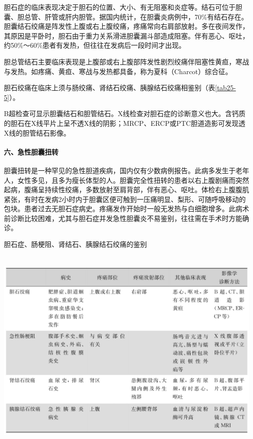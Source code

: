 胆石症的临床表现决定于胆石的位置、大小、有无阻塞和炎症等。结石可位于胆囊、胆总管、肝管或肝内胆管。据国内统计，在胆囊炎病例中，70\%有结石存在。胆囊结石绞痛是阵发性上腹或右上腹绞痛，疼痛常向右肩部放射。多在夜间发作，其原因是平卧时，胆石由于重力关系滑进胆囊漏斗部造成阻塞。伴有恶心、呕吐，约50\%～60\%患者有发热，但往往在发病后一段时间才出现。

胆总管结石主要临床表现是上腹部或右上腹部阵发性剧烈绞痛伴阻塞性黄疸，寒战与发热。如疼痛、黄疸、寒战与发热都具备，称为夏科（Charcot）综合征。

胆石绞痛在临床上须与肠绞痛、肾结石绞痛、胰腺结石绞痛相鉴别（表\ref{tab25-5}）。

B超检查可显示胆囊结石和胆管结石。X线检查对胆石症的诊断意义也大。含钙质的胆石在X线平片上呈不透X线的阴影；MRCP、ERCP或PTC胆道造影可发现透X线的胆管结石影像。

\paragraph{六、急性胆囊扭转}

胆囊扭转是一种罕见的急性胆道疾病，国内仅有少数病例报告。此病多发生于老年人，女性多见，且多为瘦长体型的人。胆囊完全性扭转的患者以右上腹剧痛而突然起病，腹痛呈持续性绞痛，多数放射至肩背部，伴有恶心、呕吐。体检右上腹腹肌紧张，有时在发病2小时内于胆囊区便可触到一压痛明显、梨形、可随呼吸移动的包块。患者过去无胆石症病史。疼痛发作开始时一般无发热与白细胞增多。此病术前诊断比较困难，尤其与胆石症并发急性胆囊炎不易鉴别，往往需在手术时方能确诊。

\begin{table}[htbp]
\centering
\caption{胆石症、肠梗阻、肾结石、胰腺结石绞痛的鉴别}
\label{tab25-5}
\includegraphics[width=5.91667in,height=4.05208in]{./images/Image00145.jpg}
\end{table}

